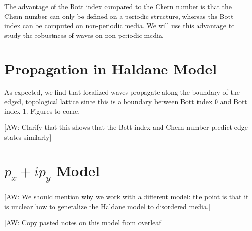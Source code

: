\documentclass[a4paper]{article}
\newcommand{\aw}[1]{{\color{blue} [AW: #1]}}
\begin{document}
The advantage of the Bott index compared to the Chern number is that the Chern number can only be defined on a periodic structure, whereas the Bott index can be computed on non-periodic media.
We will use this advantage to study the robustness of waves on non-periodic media.

\section{Propagation in Haldane Model}
As expected, we find that localized waves propagate along the boundary of the edged, topological lattice since this is a boundary between Bott index 0 and Bott index 1. Figures to come.

\aw{Clarify that this shows that the Bott index and Chern number predict edge states similarly}

\section{\texorpdfstring{$p_x + ip_y$}{px + ipy} Model}
\aw{We should mention why we work with a different model: the point is that it is unclear how to generalize the Haldane model to disordered media.}

\aw{Copy pasted notes on this model from overleaf} 
\end{document}
